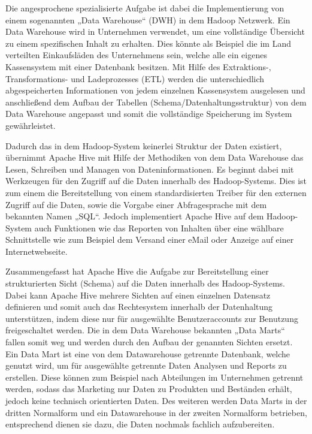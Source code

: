 {Die angesprochene spezialisierte Aufgabe ist dabei die Implementierung von
einem sogenannten „Data Warehouse“ (DWH) in dem Hadoop Netzwerk. Ein Data
Warehouse wird in Unternehmen verwendet, um eine vollständige Übersicht zu
einem spezifischen Inhalt zu erhalten. Dies könnte als Beispiel die im Land
verteilten Einkaufsläden des Unternehmens sein, welche alle ein eigenes
Kassensystem mit einer Datenbank besitzen. Mit Hilfe des Extraktions-,
Transformations- und Ladeprozesses (ETL) werden die unterschiedlich
abgespeicherten Informationen von jedem einzelnen Kassensystem ausgelesen und
anschließend dem Aufbau der Tabellen (Schema/Datenhaltungsstruktur) von dem
Data Warehouse angepasst und somit die vollständige Speicherung im System
gewährleistet.

Dadurch das in dem Hadoop\hyp{}System keinerlei Struktur der Daten existiert,
übernimmt Apache Hive mit Hilfe der Methodiken von dem Data Warehouse das
Lesen, Schreiben und Managen von Dateninformationen. Es beginnt dabei mit
Werkzeugen für den Zugriff auf die Daten innerhalb des Hadoop\hyp{}Systems.
Dies ist zum einem die Bereitstellung von einem standardisierten Treiber für
den externen Zugriff auf die Daten, sowie die Vorgabe einer Abfragesprache mit
dem bekannten Namen „SQL“. Jedoch implementiert Apache Hive auf dem
Hadoop\hyp{}System auch Funktionen wie das Reporten von Inhalten über eine
wählbare Schnittstelle wie zum Beispiel dem Versand einer eMail oder Anzeige
auf einer Internetwebseite.

Zusammengefasst hat Apache Hive die Aufgabe zur Bereitstellung einer
strukturierten Sicht (Schema) auf die Daten innerhalb des Hadoop\hyp{}Systems.
Dabei kann Apache Hive mehrere Sichten auf einen einzelnen Datensatz definieren
und somit auch das Rechtesystem innerhalb der Datenhaltung unterstützen, indem
diese nur für ausgewählte Benutzeraccounts zur Benutzung freigeschaltet werden.
Die in dem Data Warehouse bekannten „Data Marts“ fallen somit weg und werden
durch den Aufbau der genannten Sichten ersetzt. Ein Data Mart ist eine von dem
Datawarehouse getrennte Datenbank, welche genutzt wird, um für ausgewählte
getrennte Daten Analysen und Reports zu erstellen. Diese können zum Beispiel
nach Abteilungen im Unternehmen getrennt werden, sodass das Marketing nur Daten
zu Produkten und Beständen erhält, jedoch keine technisch orientierten Daten.
Des weiteren werden Data Marts in der dritten Normalform und ein Datawarehouse
in der zweiten Normalform betrieben, entsprechend dienen sie dazu, die Daten
nochmals fachlich aufzubereiten.
\nl%

}
